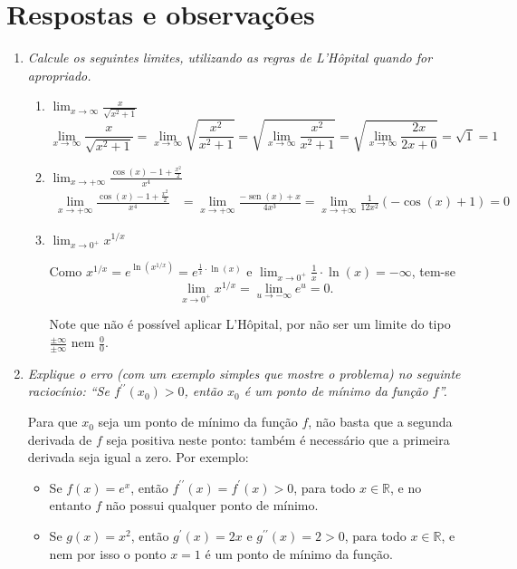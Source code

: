 \documentclass[12pt,a4paper]{article}
\newcommand*\sen{\operatorname{sen}}
\newcommand*\R{\mathbb{R}}
\begin{document}
\newpage
\restoregeometry
\section*{Respostas e observações}
\begin{enumerate}
\item \textit{Calcule os seguintes limites, utilizando as regras de L'Hôpital quando for apropriado.}
\begin{enumerate}
\item $\displaystyle\lim_{x\to\infty} \frac{x}{\sqrt{x^2+1}}$
\[
  \lim_{x\to\infty} \frac{x}{\sqrt{x^2+1}}
= \lim_{x\to\infty} \sqrt{\frac{x^2}{x^2+1}}
= \sqrt{ \lim_{x\to\infty} \frac{x^2}{x^2+1}}
= \sqrt{ \lim_{x\to\infty} \frac{2x}{2x+0}}
= \sqrt{1}
= 1
\]

\item $\displaystyle\lim_{x\to +\infty} \frac{\cos(x)-1+\frac{x^2}{2}}{x^4}$
\begin{align*}
  \lim_{x\to +\infty} \frac{\cos(x)-1+\frac{x^2}{2}}{x^4}
& = \lim_{x\to +\infty} \frac{-\sen(x)+x}{4x^3}
= \lim_{x\to +\infty} \frac{1}{12x^2}(-\cos(x)+1)
= 0
\end{align*}
\item $\displaystyle\lim_{x\to 0^+} x^{1/x}$

Como $x^{1/x} = e^{\ln( x^{1/x} )} = e^{ \frac{1}{x} \cdot \ln( x ) }$ e $\lim_{x\to 0^+}\frac{1}{x} \cdot \ln( x ) = -\infty$, tem-se
\[
  \lim_{x\to 0^+} x^{1/x}
= \lim_{u\to -\infty} e^{u}
= 0.
\]

Note que não é possível aplicar L'Hôpital, por não ser um limite do tipo $\frac{ \pm\infty }{ \pm\infty }$ nem $\frac{0}{0}$.
\end{enumerate}

\item \textit{ Explique o erro (com um exemplo simples que mostre o problema) no seguinte raciocínio: ``Se $f^{\prime\prime}(x_0) > 0$, então $x_0$ é um ponto de mínimo da função $f$''. }

Para que $x_0$ seja um ponto de mínimo da função $f$, não basta que a segunda derivada de $f$ seja positiva neste ponto: também é necessário que a primeira derivada seja igual a zero. Por exemplo:
\begin{itemize}
\item Se $f(x) = e^x$, então $f^{\prime\prime}(x) = f^\prime(x) > 0$, para todo $x \in \R$, e no entanto $f$ não possui qualquer ponto de mínimo.
\item Se $g(x) = x^2$, então $g^\prime(x) = 2x$ e $g^{\prime\prime}(x) = 2 > 0$, para todo $x \in \R$, e nem por isso o ponto $x=1$ é um ponto de mínimo da função.
\end{itemize}


\end{enumerate}
\end{document}
